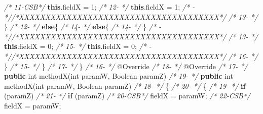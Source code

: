\documentclass[
]{article}
\newenvironment{Shaded}{\begin{snugshade}}{\end{snugshade}}
\newcommand{\AttributeTok}[1]{\textcolor[rgb]{0.77,0.63,0.00}{#1}}
\newcommand{\BuiltInTok}[1]{#1}
\newcommand{\CommentTok}[1]{\textcolor[rgb]{0.56,0.35,0.01}{\textit{#1}}}
\newcommand{\DataTypeTok}[1]{\textcolor[rgb]{0.13,0.29,0.53}{#1}}
\newcommand{\DecValTok}[1]{\textcolor[rgb]{0.00,0.00,0.81}{#1}}
\newcommand{\FunctionTok}[1]{\textcolor[rgb]{0.00,0.00,0.00}{#1}}
\newcommand{\KeywordTok}[1]{\textcolor[rgb]{0.13,0.29,0.53}{\textbf{#1}}}
\newcommand{\NormalTok}[1]{#1}
\begin{document}
\begin{Shaded}
\begin{Highlighting}[]
\CommentTok{/* 11-CSB*/}            \KeywordTok{this}\NormalTok{.}\FunctionTok{fieldX}\NormalTok{ = }\DecValTok{1}\NormalTok{;                             }\CommentTok{/* 12-   */}            \KeywordTok{this}\NormalTok{.}\FunctionTok{fieldX}\NormalTok{ = }\DecValTok{1}\NormalTok{;                             }
\CommentTok{/*   -   *//*XXXXXXXXXXXXXXXXXXXXXXXXXXXXXXXXXXXXXX*/}               \CommentTok{/* 13-   */}\NormalTok{        \}                                                            }
\CommentTok{/* 12-   */}        \KeywordTok{else}\NormalTok{\{                                            }\CommentTok{/* 14-   */}        \KeywordTok{else}\NormalTok{\{                                            }
\CommentTok{/* 14-   */}\NormalTok{     \}                                                        }\CommentTok{/*   -   *//*XXXXXXXXXXXXXXXXXXXXXXXXXXXXXXXXXXXXXX*/}               
\CommentTok{/* 13-   */}            \KeywordTok{this}\NormalTok{.}\FunctionTok{fieldX}\NormalTok{ = }\DecValTok{0}\NormalTok{;                             }\CommentTok{/* 15-   */}            \KeywordTok{this}\NormalTok{.}\FunctionTok{fieldX}\NormalTok{ = }\DecValTok{0}\NormalTok{;                             }
\CommentTok{/*   -   *//*XXXXXXXXXXXXXXXXXXXXXXXXXXXXXXXXXXXXXX*/}               \CommentTok{/* 16-   */}\NormalTok{        \}                                                }
\CommentTok{/* 15-   */}\NormalTok{    \}                                                    }\CommentTok{/* 17-   */}\NormalTok{    \}                                                    }
\CommentTok{/* 16-   */}    \AttributeTok{@Override}                                            \CommentTok{/* 18-   */}    \AttributeTok{@Override}                                            
\CommentTok{/* 17-   */}    \KeywordTok{public} \DataTypeTok{int} \FunctionTok{methodX}\NormalTok{(}\DataTypeTok{int}\NormalTok{ paramW, }\BuiltInTok{Boolean}\NormalTok{ paramZ)       }\CommentTok{/* 19-   */}    \KeywordTok{public} \DataTypeTok{int} \FunctionTok{methodX}\NormalTok{(}\DataTypeTok{int}\NormalTok{ paramW, }\BuiltInTok{Boolean}\NormalTok{ paramZ)       }
\CommentTok{/* 18-   */}\NormalTok{    \{                                                    }\CommentTok{/* 20-   */}\NormalTok{    \{                                                    }
\CommentTok{/* 19-   */}        \KeywordTok{if}\NormalTok{ (paramZ)                                      }\CommentTok{/* 21-   */}        \KeywordTok{if}\NormalTok{ (paramZ)                                      }
\CommentTok{/* 20-CSB*/}\NormalTok{            fieldX = paramW;                             }\CommentTok{/* 22-CSB*/}\NormalTok{            fieldX = paramW;                             }

\end{Highlighting}
\end{Shaded}
\end{document}
